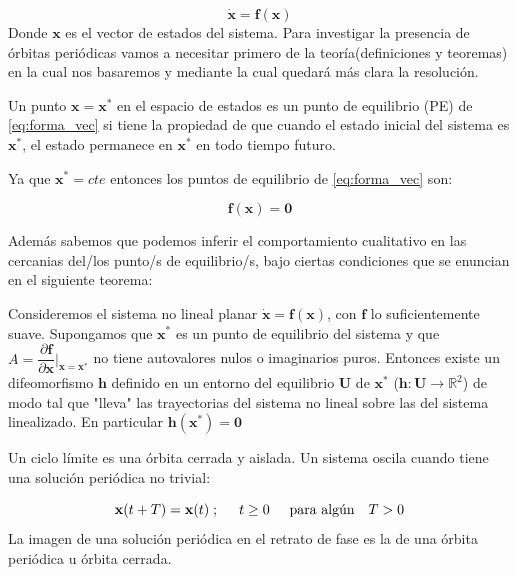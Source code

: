 \documentclass[10pt]{article}
\begin{document}
\begin{equation}
 \dot{\mathbf{x}}=\mathbf{f}(\mathbf{x}) \label{eq:forma_vec}
\end{equation}
Donde $\mathbf{x}$ es el vector de estados del sistema.
Para investigar la presencia de órbitas periódicas vamos a necesitar primero de la teoría(definiciones y teoremas) en la cual nos basaremos y mediante la cual quedará más clara la resolución.

\begin{defi}
 Un punto $\mathbf{x}=\mathbf{x}^{*}$ en el espacio de estados es un punto de equilibrio (PE) de \eqref{eq:forma_vec} si tiene la propiedad de 
que cuando el estado inicial del sistema es $\mathbf{x}^{*}$, el estado permanece en $\mathbf{x}^{*}$ en todo tiempo futuro.
\end{defi}

Ya que $\mathbf{x}^{*}=cte$ entonces los puntos de equilibrio de \eqref{eq:forma_vec} son:

\begin{equation}
 \mathbf{f}(\mathbf{x})=\mathbf{0} \label{eq:pe}
\end{equation}

Además sabemos que podemos inferir el comportamiento cualitativo en las cercanias del/los punto/s de equilibrio/s, bajo ciertas condiciones 
que se enuncian en el siguiente teorema:

\begin{teo}

Consideremos el sistema no lineal planar $ \dot{\mathbf{x}}=\mathbf{f}(\mathbf{x})$, con $\mathbf{f}$ lo suficientemente suave. Supongamos que $\mathbf{x}^{*}$
es un punto de equilibrio del sistema y que $A=\dfrac{\partial \mathbf{f}}{\partial \mathbf{x}}\bigg\vert_{\mathbf{x}=\mathbf{x}^{*}}$ no tiene autovalores
nulos o imaginarios puros. Entonces existe un difeomorfismo $\mathbf{h}$ definido en un entorno del equilibrio $\mathbf{U}$ de $\mathbf{x}^{*}$ ($\mathbf{h}:\mathbf{U} \longrightarrow \mathbb{R}^{2}$) de modo tal que "lleva"
las trayectorias del sistema no lineal sobre las del sistema linealizado. En particular $\mathbf{h}(\mathbf{x}^{*})=\mathbf{0}$
\label{hart}

\end{teo}

\begin{defi}
Un ciclo límite es una órbita cerrada y aislada. Un sistema oscila cuando tiene una solución periódica no trivial:

\begin{equation}
\mathbf{x}(t+T)=\mathbf{x}(t) \; ; \hspace{.5cm} t\geq 0 \hspace{.5cm} \text{para algún} \quad  T > 0
\end{equation}
La imagen de una solución periódica en el retrato de fase es la de una órbita periódica u órbita cerrada. 
\end{defi}
\end{document}
